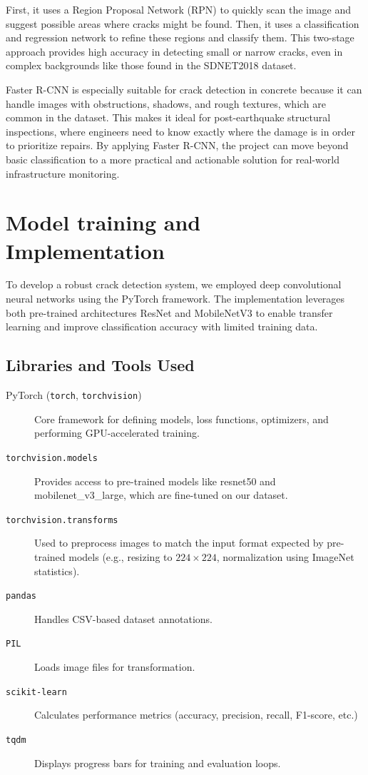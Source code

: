 First, it uses a Region Proposal Network (RPN) to quickly scan the image and suggest possible areas where cracks might be found. Then, it uses a classification and regression network to refine these regions and classify them. This two-stage approach provides high accuracy in detecting small or narrow cracks, even in complex backgrounds like those found in the SDNET2018 dataset.

Faster R-CNN is especially suitable for crack detection in concrete because it can handle images with obstructions, shadows, and rough textures, which are common in the dataset. This makes it ideal for post-earthquake structural inspections, where engineers need to know exactly where the damage is in order to prioritize repairs. By applying Faster R-CNN, the project can move beyond basic classification to a more practical and actionable solution for real-world infrastructure monitoring.

\section{Model training and Implementation}

To develop a robust crack detection system, we employed deep convolutional neural networks using the PyTorch framework. The implementation leverages both pre-trained architectures ResNet and MobileNetV3 to enable transfer learning and improve classification accuracy with limited training data.

\subsection{Libraries and Tools Used}

\begin{description}
	\item[PyTorch (\texttt{torch}, \texttt{torchvision})] Core framework for defining models, loss functions, optimizers, and performing GPU-accelerated training.
	\item[\texttt{torchvision.models}] Provides access to pre-trained models like resnet50 and mobilenet\_v3\_large, which are fine-tuned on our dataset.
	\item[\texttt{torchvision.transforms}] Used to preprocess images to match the input format expected by pre-trained models (e.g., resizing to $224\times224$, normalization using ImageNet statistics).
	\item[\texttt{pandas}] Handles CSV-based dataset annotations.
	\item[\texttt{PIL}] Loads image files for transformation.
	\item[\texttt{scikit-learn}] Calculates performance metrics (accuracy, precision, recall, F1-score, etc.)
	\item[\texttt{tqdm}] Displays progress bars for training and evaluation loops.
\end{description}

